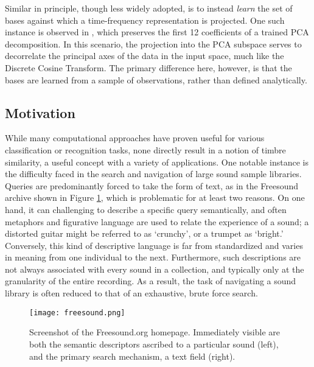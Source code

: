 Similar in principle, though less widely adopted, is to instead \emph{learn} the set of bases against which a time-frequency representation is projected.
One such instance is observed in  \cite{Jehan2005}, which preserves the first 12 coefficients of a trained PCA decomposition.
In this scenario, the projection into the PCA subspace serves to decorrelate the principal axes of the data in the input space, much like the Discrete Cosine Transform.
The primary difference here, however, is that the bases are learned from a sample of observations, rather than defined analytically.



\subsection{Motivation}

While many computational approaches have proven useful for various classification or recognition tasks, none directly result in a notion of timbre similarity, a useful concept with a variety of applications.
One notable instance is the difficulty faced in the search and navigation of large sound sample libraries.
Queries are predominantly forced to take the form of text, as in the Freesound archive shown in
Figure \ref{fig:freesound}, which is problematic for at least two reasons.
On one hand, it can challenging to describe a specific query semantically, and often metaphors and figurative language are used to relate the experience of a sound; a distorted guitar might be referred to as `crunchy', or a trumpet as `bright.'
Conversely, this kind of descriptive language is far from standardized and varies in meaning from one individual to the next.
Furthermore, such descriptions are not always associated with every sound in a collection, and typically only at the granularity of the entire recording.
As a result, the task of navigating a sound library is often reduced to that of an exhaustive, brute force search.

\begin{figure}[t]
\centering
\texttt{[image: freesound.png]}
\caption{Screenshot of the Freesound.org homepage. Immediately visible are both the semantic descriptors ascribed to a particular sound (left), and the primary search mechanism, a text field (right).}
\label{fig:freesound}
\end{figure}

